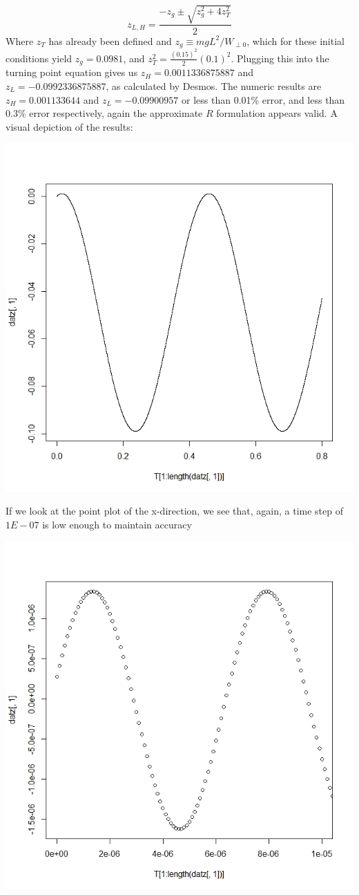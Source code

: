 \documentclass[12pt]{article}
\begin{document}
$$z_{L,H}=\frac{-z_g\pm\sqrt{z^2_g+4z_T^2}}{2}$$
Where $z_T$ has already been defined and $z_g \equiv mgL^2/W_{\perp 0}$, which for these initial conditions yield $z_g=0.0981$, and $z_T^2=\frac{(0.15)^2}{2}(0.1)^2$. Plugging this into the turning point equation gives us $z_H=0.0011336875887$ and $z_L=-0.0992336875887$, as calculated by Desmos. The numeric results are $z_H=0.001133644$ and $z_L=-0.09900957$ or less than 0.01\% error, and less than 0.3\% error respectively, again the approximate $R$ formulation appears valid. A visual depiction of the results:

\includegraphics[scale=0.35]{zvtg(L=01,R=2)}

If we look at the point plot of the x-direction, we see that, again, a time step of $1E-07$ is low enough to maintain accuracy

\includegraphics[scale=0.35]{xvtgp(L=01,R=2)} 
\end{document}
